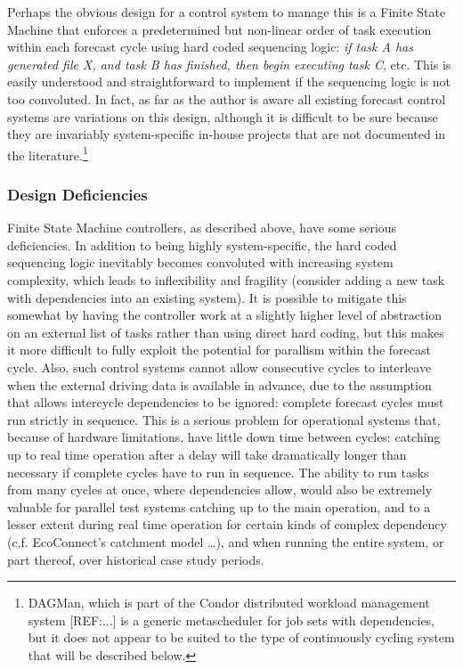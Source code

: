 \documentclass[11pt,a4paper]{article}
\begin{document}
Perhaps the obvious design for a control system to manage this is a
Finite State Machine that enforces a predetermined but non-linear order
of task execution within each forecast cycle using hard coded sequencing
logic: {\em if task A has generated file X, and task B has finished,
then begin executing task C}, etc. This is easily understood and
straightforward to implement if the sequencing logic is not too
convoluted. In fact, as far as the author is aware all existing forecast
control systems are variations on this design, although it is difficult
to be sure because they are invariably system-specific in-house projects
that are not documented in the literature.\footnote{DAGMan, which is
part of the Condor distributed workload management system [REF:...] is a
generic metascheduler for job sets with dependencies, but it does not
appear to be suited to the type of continuously cycling system that will
be described below.}

\subsubsection{Design Deficiencies}

Finite State Machine controllers, as described above, have some serious
deficiencies. In addition to being highly system-specific, the hard
coded sequencing logic inevitably becomes convoluted with increasing
system complexity, which leads to inflexibility and fragility (consider
adding a new task with dependencies into an existing system). It is
possible to mitigate this somewhat by having the controller work at a
slightly higher level of abstraction on an external list of tasks rather
than using direct hard coding, but this makes it more difficult to fully
exploit the potential for parallism within the forecast cycle. Also,
such control systems cannot allow consecutive cycles to interleave when
the external driving data is available in advance, due to the assumption
that allows intercycle dependencies to be ignored: complete forecast
cycles must run strictly in sequence. This is a serious problem for
operational systems that, because of hardware limitations, have little
down time between cycles: catching up to real time operation after a
delay will take dramatically longer than necessary if complete cycles
have to run in sequence. The ability to run tasks from many cycles at
once, where dependencies allow, would also be extremely valuable for
parallel test systems catching up to the main operation, and to a lesser
extent during real time operation for certain kinds of complex
dependency (c.f.  EcoConnect's catchment model \dots), and when running
the entire system, or part thereof, over historical case study periods.  
\end{document}
